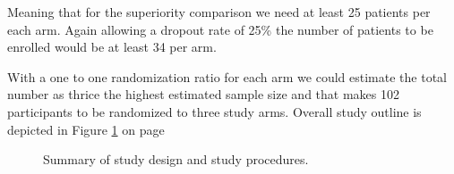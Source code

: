 \documentclass{article}\usepackage[]{graphicx}\usepackage[]{color}
\begin{document}
Meaning that for the superiority comparison we need at least 25 patients per each arm. Again allowing a dropout rate of 25\% the number of patients to be enrolled would be at least 34 per arm.

With a one to one randomization ratio for each arm we could estimate the total number as thrice the highest estimated sample size and that makes 102 participants to be randomized to three study arms. Overall study outline is depicted in Figure \ref{fig:studyoutline} on page \pageref{fig:studyoutline}

\begin{figure}
  \centering

  \noindent{}

  \caption {Summary of study design and study procedures.}
  \label{fig:studyoutline}
\end{figure}
\end{document}

